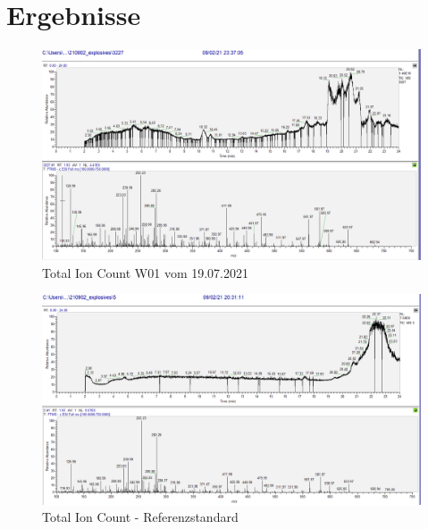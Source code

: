  

\chapter{Ergebnisse}

\begin{figure}[htb]
\includegraphics[height=\textheight,%
                   width=\textwidth,%
                   keepaspectratio]{"TIC_3227_SampleW1.PNG"}
\caption{Total Ion Count W01 vom 19.07.2021}
\end{figure}
\begin{figure}[htb]
\includegraphics[height=\textheight,%
                   width=\textwidth,%
                   keepaspectratio]{"TIC_5ppbSTandard.PNG"}
\caption{Total Ion Count - Referenzstandard}
\end{figure}
